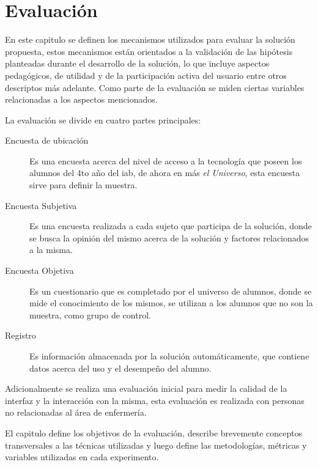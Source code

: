 
\chapter{Evaluación}
\label{chap:evaluacion}


En este capitulo se definen los mecanismos utilizados para evaluar la solución
propuesta, estos mecanismos están orientados a la validación de las hipótesis
planteadas durante el desarrollo de la solución, lo que incluye aspectos
pedagógicos, de utilidad y de la participación activa del usuario entre otros
descriptos más adelante. Como parte de la evaluación se miden ciertas variables
relacionadas a los aspectos mencionados.

La evaluación se divide en cuatro partes principales:

\begin{description}
    \item[Encuesta de ubicación] Es una encuesta acerca del nivel de acceso a la
        tecnología que poseen los alumnos del 4to año del \Gls{iab}, de ahora en
        más \textit{el Universo}, esta encuesta sirve para definir la muestra.

    \item[Encuesta Subjetiva] Es una encuesta realizada a cada sujeto que
        participa de la solución, donde se busca la opinión del mismo acerca de
        la solución y factores relacionados a la misma. 

    \item[Encuesta Objetiva] Es un cuestionario que es completado por el
        universo de alumnos, donde se mide el conocimiento de los mismos, se
        utilizan a los alumnos que no son la muestra, como   grupo de control.

    \item[Registro] Es información almacenada por la solución automáticamente,
        que contiene datos acerca del uso y el desempeño del alumno.
\end{description}


Adicionalmente se realiza una evaluación inicial para medir la calidad de la
interfaz y la interacción con la misma, esta evaluación es realizada con
personas no relacionadas al área de enfermería.

El capitulo define los objetivos de la evaluación, describe brevemente conceptos
transversales a las técnicas utilizadas y luego define las metodologías,
métricas y variables utilizadas en cada experimento.








